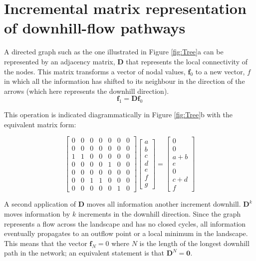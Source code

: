 \documentclass[draft,jgrga]{agu_template/AGUTeX}
\begin{document}
\section{Incremental matrix representation of downhill-flow pathways}

A directed graph such as the one illustrated in Figure \ref{fig:Tree}a can be represented by an adjacency matrix, $\bm{D}$ that represents the local connectivity of the nodes. This matrix transforms a vector of nodal values, $\bm{f}_0$ to a new vector, $f$ in which all the information has shifted to its neighbour in the direction of the arrows (which here represents the downhill direction). 
\begin{equation}
	\bm{f}_1 = \bm{D} \bm{f}_0 
\end{equation}

This operation is indicated diagrammatically in Figure \ref{fig:Tree}b with the equivalent matrix form:

\begin{equation}
\begin{bmatrix}
 0 & 0 & 0 & 0 & 0 & 0 & 0 \\
 0 & 0 & 0 & 0 & 0 & 0 & 0 \\
 1 & 1 & 0 & 0 & 0 & 0 & 0 \\
 0 & 0 & 0 & 0 & 1 & 0 & 0 \\
 0 & 0 & 0 & 0 & 0 & 0 & 0 \\
 0 & 0 & 1 & 1 & 0 & 0 & 0 \\
 0 & 0 & 0 & 0 & 0 & 1 & 0 
\end{bmatrix}
\begin{bmatrix}
 a  \\
 b  \\
 c  \\
 d  \\
 e  \\
 f  \\
 g  
\end{bmatrix} =
\begin{bmatrix}
 0  \\
 0  \\
 a+b  \\
 e  \\
 0  \\
 c+d  \\
 f  
\end{bmatrix}
\end{equation}

A second application of $\bm{D}$ moves all information another increment downhill. $\bm{D}^k$ moves information by $k$ increments in the downhill direction. Since the graph represents a flow across the landscape and has no closed cycles, all information eventually propagates to an outflow point or a local minimum in the landscape. This means that the vector $\bm{f}_N = 0$ where $N$ is the length of the longest downhill path in the network;  an equivalent statement is that $\bm{D}^N = \bm{0}$. 
\end{document}
